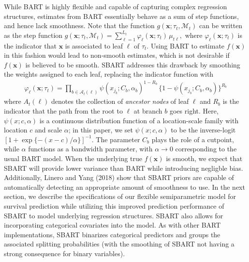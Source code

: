 \documentclass[11pt]{article}
\begin{document}
 While BART is highly flexible and capable of capturing complex regression structures, estimates from BART essentially behave as a sum of step functions, and hence lack smoothness. Note that the function $g(\mathbf x; \tau_t, \mathcal M_t)$ can be written as the step function
 \begin{math}
     g(\mathbf x; \tau_t, \mathcal M_t)
     =
     \sum_{\ell=1}^{L_t} \varphi_\ell(\mathbf x; \tau_t) \, \mu_{t\ell},
 \end{math}
 where $\varphi_\ell(\mathbf x; \tau_t)$ is the indicator that $\mathbf x$ is associated to leaf $\ell$ of $\tau_t$. Using BART to estimate $f(\mathbf x)$ in this fashion would lead to non-smooth estimates, which is not desirable if $f(\mathbf x)$ is believed to be smooth. SBART addresses this drawback by smoothing the weights assigned to each leaf, replacing the indicator function with
 \begin{align*}
     \varphi_\ell(\mathbf x; \tau_t)
     =
     \prod_{b \in \mathcal A_t(\ell)} 
     \psi(x_{j_b} ; C_b, \alpha_b)^{1-R_b} 
     \, 
     \{1-\psi(x_{j_b}; C_b, \alpha_b)\}^{R_b}
 \end{align*}
 where $A_t(\ell)$ denotes the collection of \emph{ancestor nodes} of leaf $\ell$ and $R_b$ is the indicator that the path from the root to $\ell$ at branch $b$ goes right. Here, $\psi(x; c, \alpha)$ is a continuous distribution function of a location-scale family with location $c$ and scale $\alpha$; in this paper, we set $\psi(x; c, \alpha)$ to be the inverse-logit $[1 + \exp\{-(x - c) / \alpha\}]^{-1}$. The parameter $C_b$ plays the role of a cutpoint, while $\alpha$ functions as a bandwidth parameter, with $\alpha \to 0$ corresponding to the usual BART model. When the underlying true $f(\mathbf x)$ is smooth, we expect that SBART will provide lower variance than BART while introducing negligble bias. Additionally, Linero and Yang (2018) show that SBART priors are capable of automatically detecting an appropriate amount of smoothness to use. In the next section, we describe the specifications of our flexible semiparametric model for survival prediction while utilizing this improved prediction performance of SBART to model underlying regression structures.
 \color{red}
  SBART also allows for incorporating categorical covariates into the model. As with other BART implementations, SBART binarizes categorical predictors and groups the associated splitting probabilities (with the smoothing of SBART not having a strong consequence for binary variables). 
 
\end{document}
